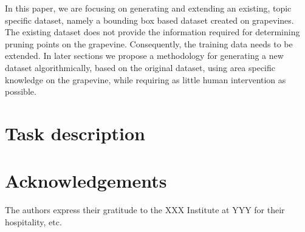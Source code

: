 \documentclass{PSAIE}%
\begin{document}
In this paper, we are focusing on generating and extending an existing, topic specific dataset, namely
a bounding box based dataset created on grapevines. The existing dataset does not provide the information
required for determining pruning points on the grapevine. Consequently, the training data needs to be
extended. In later sections we propose a methodology for generating a new dataset algorithmically, based on
the original dataset, using area specific knowledge on the grapevine, while requiring as little human
intervention as possible.

\section{Task description} \label{sec_task_description}

\section*{Acknowledgements}
\noindent
The authors express their gratitude to the XXX Institute at YYY for
their hospitality, etc.



\end{document}

